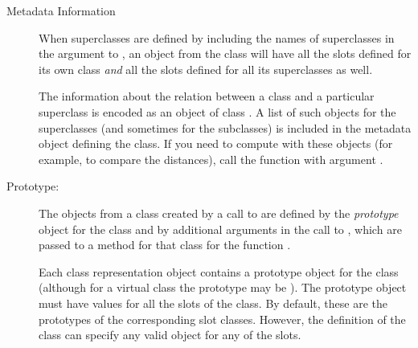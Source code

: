\begin{Section}{Metadata Information}
\begin{description}
When superclasses are defined  by including the names of
superclasses in the  argument to
, an object from the class will have all the
slots defined for its own class \emph{and} all the slots defined
for all its superclasses as well.

The information about the relation between a class and a
particular superclass is encoded as an object of class
.  A list of such objects for
the superclasses (and sometimes for the subclasses) is included in
the metadata object defining the class.  If you need to compute
with these objects (for example, to compare the distances), call
the function  with argument .


\item[Prototype:] 

The objects from a class created by a call to
are defined by the \emph{prototype} object for the class and by
additional arguments in the call to , which are
passed to a method for that class for the function
.

Each class representation object contains a prototype object
for the class (although for a virtual class the prototype may be
). The prototype object must have values for all the
slots of the class.
By default, these are the prototypes of the corresponding slot
classes.  However, the definition of the class can specify any
valid object for any of the slots.


\end{description}

\end{Section}
%
